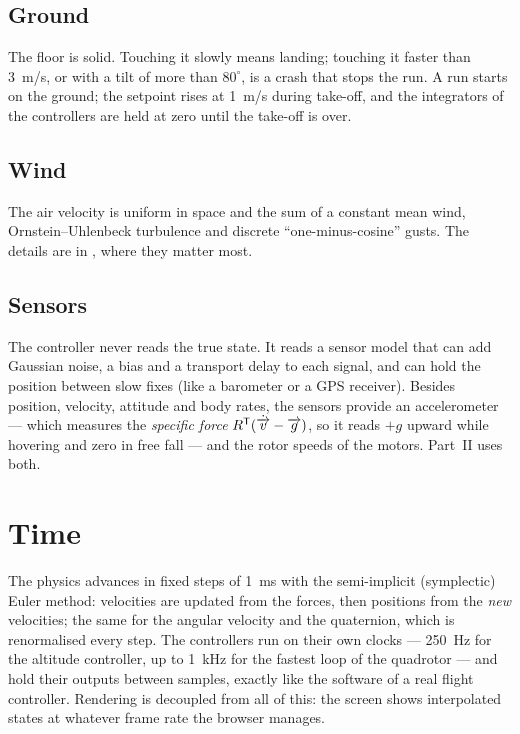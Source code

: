 \subsection*{Ground}
The floor is solid. Touching it slowly means landing; touching it faster than \SI{3}{m/s}, or with a tilt of more than $80^\circ$, is a crash that stops the run. A run starts on the ground; the setpoint rises at \SI{1}{m/s} during take-off, and the integrators of the controllers are held at zero until the take-off is over.

\subsection*{Wind}
The air velocity is uniform in space and the sum of a constant mean wind, Ornstein–Uhlenbeck turbulence and discrete \enquote{one-minus-cosine} gusts. The details are in , where they matter most.

\subsection*{Sensors}
The controller never reads the true state. It reads a sensor model that can add Gaussian noise, a bias and a transport delay to each signal, and can hold the position between slow fixes (like a barometer or a GPS receiver). Besides position, velocity, attitude and body rates, the sensors provide an accelerometer — which measures the \emph{specific force} $R^{\mathsf{T}}(\dot{\overrightarrow{v}} - \overrightarrow{g})$, so it reads $+g$ upward while hovering and zero in free fall — and the rotor speeds of the motors. Part~II uses both.

\section*{Time}

The physics advances in fixed steps of \SI{1}{ms} with the semi-implicit (symplectic) Euler method: velocities are updated from the forces, then positions from the \emph{new} velocities; the same for the angular velocity and the quaternion, which is renormalised every step. The controllers run on their own clocks — \SI{250}{Hz} for the altitude controller, up to \SI{1}{kHz} for the fastest loop of the quadrotor — and hold their outputs between samples, exactly like the software of a real flight controller. Rendering is decoupled from all of this: the screen shows interpolated states at whatever frame rate the browser manages.

